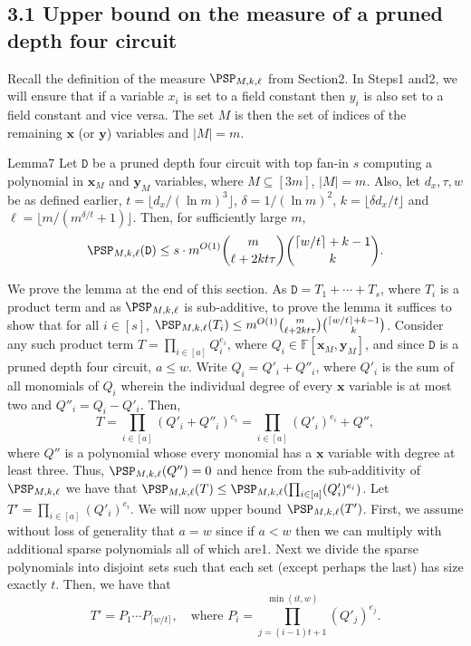 \subsection*{3.1 Upper bound on the measure of a pruned depth four circuit}
Recall the definition of the measure $\PSP_{M,k,\ell}$ from Section2. In Steps1 and2, we will ensure that if a variable $x_i$ is set to a field constant then $y_i$ is also set to a field constant and vice versa. The set $M$ is then the set of indices of the remaining $\mathbf x$ (or $\mathbf y$) variables and $|M|=m$.
\begin{authorclaim}{Lemma7}
Let $\mathtt D$ be a pruned depth four circuit with top fan-in $s$ computing a polynomial in $\mathbf x_M$ and $\mathbf y_M$ variables, where $M\subseteq[3m]$, $|M|=m$. Also, let $d_x,\tau,w$ be as defined earlier, $t=\lfloor d_x/(\ln m)^3\rfloor$, $\delta=1/(\ln m)^2$, $k=\lfloor\delta d_x/t\rfloor$ and $\ell=\lfloor m/(m^{\delta/t}+1)\rfloor$. Then, for sufficiently large $m$,
\[
\PSP_{M,k,\ell}(\mathtt D)\le s\cdot m^{O(1)}\binom m{\ell+2kt\tau}\binom{\lceil w/t\rceil+k-1}{k}.
\]
\end{authorclaim}
We prove the lemma at the end of this section. As $\mathtt D=T_1+\cdots+T_s$, where $T_i$ is a product term and as $\PSP_{M,k,\ell}$ is sub-additive, to prove the lemma it suffices to show that for all $i\in[s]$,
$\PSP_{M,k,\ell}(T_i)\le m^{O(1)}\binom m{\ell+2kt\tau}\binom{\lceil w/t\rceil+k-1}{k}$.
Consider any such product term $T=\prod_{i\in[a]}Q_i^{e_i}$, where $Q_i\in\mathbb F[\mathbf x_M,\mathbf y_M]$, and since $\mathtt D$ is a pruned depth four circuit, $a\le w$. Write $Q_i=Q'_i+Q''_i$, where $Q'_i$ is the sum of all monomials of $Q_i$ wherein the individual degree of every $\mathbf x$ variable is at most two and $Q''_i=Q_i-Q'_i$. Then,
\[
T=\prod_{i\in[a]}(Q'_i+Q''_i)^{e_i}=\prod_{i\in[a]}(Q'_i)^{e_i}+Q'',
\]
where $Q''$ is a polynomial whose every monomial has a $\mathbf x$ variable with degree at least three. Thus, $\PSP_{M,k,\ell}(Q'')=0$ and hence from the sub-additivity of $\PSP_{M,k,\ell}$ we have that
$\PSP_{M,k,\ell}(T)\le\PSP_{M,k,\ell}(\prod_{i\in[a]}(Q'_i)^{e_i})$.
Let $T'=\prod_{i\in[a]}(Q'_i)^{e_i}$. We will now upper bound $\PSP_{M,k,\ell}(T')$. First, we assume without loss of generality that $a=w$ since if $a<w$ then we can multiply with additional sparse polynomials all of which are1. Next we divide the sparse polynomials into disjoint sets such that each set (except perhaps the last) has size exactly $t$. Then, we have that
\[
T'=P_1\cdots P_{\lceil w/t\rceil},\quad\text{where }P_i=\prod_{j=(i-1)t+1}^{\min(it,w)}(Q'_j)^{e_j}.
\]

